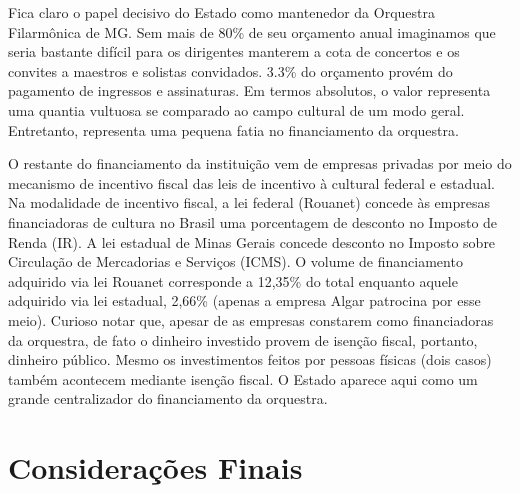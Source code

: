 \documentclass[a4paper, 12pt, openright, oneside, german, french, english, brazil]{abntex2}
\begin{document}
	Fica claro o papel decisivo do Estado como mantenedor da Orquestra Filarmônica de MG. Sem mais de 80\% de seu orçamento anual imaginamos que seria bastante difícil para os dirigentes manterem a cota de concertos e os convites a maestros e solistas convidados. 3.3\% do orçamento provém do pagamento de ingressos e assinaturas. Em termos absolutos, o valor representa uma quantia vultuosa se comparado ao campo cultural de um modo geral. Entretanto, representa uma pequena fatia no financiamento da orquestra.



	O restante do financiamento da instituição vem de empresas privadas por meio do mecanismo de incentivo fiscal das leis de incentivo à cultural federal e estadual. Na modalidade de incentivo fiscal, a lei federal (Rouanet) concede às empresas financiadoras de cultura no Brasil uma porcentagem de desconto no Imposto de Renda (IR). A lei estadual de Minas Gerais concede desconto no Imposto sobre Circulação de Mercadorias e Serviços (ICMS). O volume de financiamento adquirido via lei Rouanet corresponde a 12,35\% do total enquanto aquele adquirido via lei estadual, 2,66\% (apenas a empresa Algar patrocina por esse meio). Curioso notar que, apesar de as empresas constarem como financiadoras da orquestra, de fato o dinheiro investido provem de isenção fiscal, portanto, dinheiro público. Mesmo os investimentos feitos por pessoas físicas (dois casos) também acontecem mediante isenção fiscal. O Estado aparece aqui como um grande centralizador do financiamento da orquestra.


















	\chapter{Considerações Finais}
\end{document}
